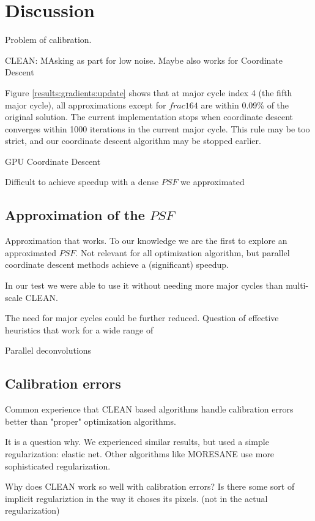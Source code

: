 \section{Discussion}\label{discussion}
Problem of calibration.


CLEAN: MAsking as part for low noise. Maybe also works for Coordinate Descent

Figure \ref{results:gradients:update} shows that at major cycle index 4 (the fifth major cycle), all approximations except for $frac{1}{64}$ are within 0.09\% of the original solution. The current implementation stops when coordinate descent converges within 1000 iterations in the current major cycle. This rule may be too strict, and our coordinate descent algorithm may be stopped earlier. 

GPU Coordinate Descent

Difficult to achieve speedup with a dense $PSF$ we approximated

\subsection{Approximation of the $PSF$}
Approximation that works. To our knowledge we are the first to explore an approximated $PSF$. Not relevant for all optimization algorithm, but parallel coordinate descent methods achieve a (significant) speedup.

In our test we were able to use it without needing more major cycles than multi-scale CLEAN.

The need for major cycles could be further reduced. 
Question of effective heuristics that work for a wide range of 

Parallel deconvolutions

\subsection{Calibration errors}
Common experience that CLEAN based algorithms handle calibration errors better \cite{offringa2017optimized} than "proper" optimization algorithms.


It is a question why. We experienced similar results, but used a simple regularization: elastic net. Other algorithms like MORESANE\cite{dabbech2015moresane} use more sophisticated regularization.

Why does CLEAN work so well with calibration errors? Is there some sort of implicit regulariztion in the way it choses its pixels. (not in the actual regularization)



